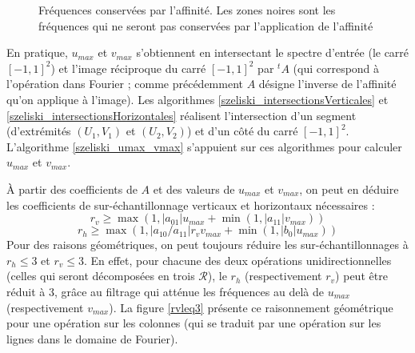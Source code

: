 \begin{figure}
		\caption{Fréquences conservées par l'affinité. Les zones noires sont les fréquences qui ne seront pas conservées par l'application de l'affinité}
		\label{uMax_vMax}
		\end{figure}
		
		En pratique, $u_{max}$ et $v_{max}$ s'obtiennent en intersectant le spectre d'entrée (le carré $[-1,1]^2$) et l'image réciproque du carré $[-1,1]^2$ par $^t\!A$ (qui correspond à l'opération dans Fourier ; comme précédemment $A$ désigne l'inverse de l'affinité qu'on applique à l'image). Les algorithmes \ref{szeliski_intersectionsVerticales} et \ref{szeliski_intersectionsHorizontales} réalisent l'intersection d'un segment (d'extrémités $(U_1,V_1)$ et $(U_2,V_2)$) et d'un côté du carré $[-1,1]^2$. L'algorithme \ref{szeliski_umax_vmax} s'appuient sur ces algorithmes pour calculer $u_{max}$ et $v_{max}$.
		
		À partir des coefficients de $A$ et des valeurs de $u_{max}$ et $v_{max}$, on peut en déduire les coefficients de sur-échantillonnage verticaux et horizontaux nécessaires \cite{szeliski2010high} :
		\[r_v \geq \max (1,|a_{01}|u_{max}+\min (1,|a_{11}|v_{max}))\]
		\[r_h \geq \max (1,|a_{10}/a_{11}|r_vv_{max}+\min (1,|b_0|u_{max}))\]
		Pour des raisons géométriques, on peut toujours réduire les sur-échantillonnages à $r_h \leq 3$ et $r_v \leq 3$. En effet, pour chacune des deux opérations unidirectionnelles (celles qui seront décomposées en trois $\mathcal R$), le $r_h$ (respectivement $r_v$) peut être réduit à 3, grâce au filtrage qui atténue les fréquences au delà de $u_{max}$ (respectivement $v_{max}$). La figure \ref{rvleq3} présente ce raisonnement géométrique pour une opération sur les colonnes (qui se traduit par une opération sur les lignes dans le domaine de Fourier).
		
